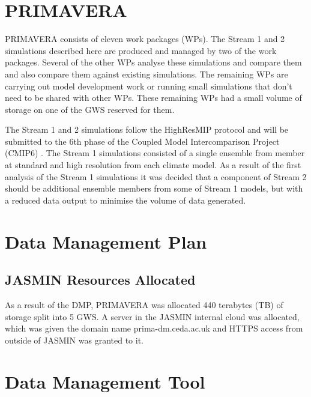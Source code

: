 \documentclass[gmd, manuscript]{copernicus}
\begin{document}
\section{PRIMAVERA}

PRIMAVERA consists of eleven work packages (WPs). The Stream 1 and 2 simulations described here are produced and managed by two of the work packages. Several of the other WPs analyse these simulations and compare them and also compare them against existing simulations. The remaining WPs are carrying out model development work or running small simulations that don't need to be shared with other WPs. These remaining WPs had a small volume of storage on one of the GWS reserved for them. 

The Stream 1 and 2 simulations follow the HighResMIP protocol and will be submitted to the 6th phase of the Coupled Model Intercomparison Project (CMIP6) \citep{Eyring2016}. The Stream 1 simulations consisted of a single ensemble from member at standard and high resolution from each climate model. As a result of the first analysis of the Stream 1 simulations it was decided that a component of Stream 2 should be additional ensemble members from some of Stream 1 models, but with a reduced data output to minimise the volume of data generated.

\section{Data Management Plan}




\subsection{JASMIN Resources Allocated}

As a result of the DMP, PRIMAVERA was allocated 440 terabytes (TB) of storage split into 5 GWS. A server in the JASMIN internal cloud was allocated, which was given the domain name prima-dm.ceda.ac.uk and HTTPS access from outside of JASMIN was granted to it.

\section{Data Management Tool}
\end{document}
